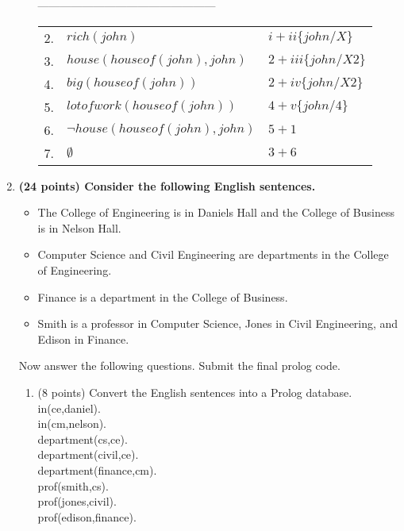 \documentclass{article}%
\begin{document}
\begin{enumerate}
\begin{enumerate}
		------------------------------------------------\\
		\begin{tabular}{c|p{8cm}|l}
		2. & $ rich(john) $ &  $i + ii \lbrace john / X \rbrace$ \\
		3. & $ house(houseof(john),john) $ &  $2+ iii \lbrace john / X2 \rbrace$ \\
		4. &$ big(houseof(john))$& $2 + iv \lbrace john / X2 \rbrace$\\
		5. & $ lotofwork(houseof(john)) $ &$ 4 + v \lbrace john / 4 \rbrace$\\
		6. & $ \neg house(houseof(john),john) $ &$ 5 + 1 $\\
		7. & $ \emptyset  $ &$ 3 + 6$\\
		\end{tabular} 
	\end{enumerate}
	
\item \textbf{(24 points) Consider the following English sentences.}

	\begin{itemize}
	\item The College of Engineering is in Daniels Hall and the College of Business is in Nelson Hall.
	\item Computer Science and Civil Engineering are departments in the College of Engineering.
	\item Finance is a department in the College of Business.
	\item Smith is a professor in Computer Science, Jones in Civil Engineering, and Edison in Finance.
	\end{itemize}

Now answer the following questions. Submit the final prolog code.

	\begin{enumerate}
	\item (8 points) Convert the English sentences into a Prolog database. \\
	in(ce,daniel). \\
in(cm,nelson). \\
department(cs,ce). \\
department(civil,ce). \\
department(finance,cm). \\
prof(smith,cs). \\
prof(jones,civil). \\
prof(edison,finance). \\




\end{enumerate}
\end{enumerate}
\end{document}

